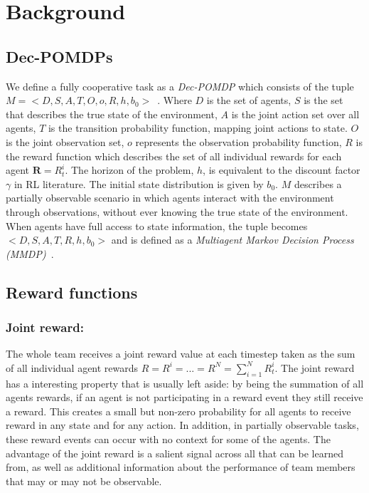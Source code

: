 \documentclass[systems,article,submit,pdftex,moreauthors]{Definitions/mdpi}
\begin{document}
\section{Background}
\label{sec:Background}

\subsection{Dec-POMDPs}
We define a fully cooperative task as a \textit{Dec-POMDP} which consists of the tuple $M = <D,S,A,T,O,o,R,h,b_0 > $~\cite{Oliehoek2016}. Where $D$ is the set of agents,  $S$ is the set that describes the true state of the environment, $A$ is the joint action set over all agents, $T$ is the transition probability function, mapping joint actions to state. $O$ is the joint observation set, $o$ represents the observation probability function, $R$ is the reward function which describes the set of all individual rewards for each agent $ \textbf{R} = R^i_t$. The horizon of the problem, $h$, is equivalent to the discount factor $\gamma$ in RL literature. The initial state distribution is given by $b_0$. $M$ describes a partially observable scenario in which agents interact with the environment through observations, without ever knowing the true state of the environment.
When agents have full access to state information, the tuple becomes $<D,S,A,T,R,h,b_0>$ and is defined as a \textit{Multiagent Markov Decision Process (MMDP)}~\cite{Oliehoek2016}. 

\subsection{Reward functions}
\subsubsection{Joint reward:} 
The whole team receives a joint reward value at each timestep taken as the sum of all individual agent rewards $R = R^i = ... = R^N = \sum^N_{i=1}R^i_t$. The joint reward has a interesting property that is usually left aside: by being the summation of all agents rewards, if an agent is not participating in a reward event they still receive a reward. This creates a small but non-zero probability for all agents to receive reward in any state and for any action. In addition, in partially observable tasks, these reward events can occur with no context for some of the agents. The advantage of the joint reward is a salient signal across all that can be learned from, as well as additional information about the performance of team members that may or may not be observable.    
\end{document}

